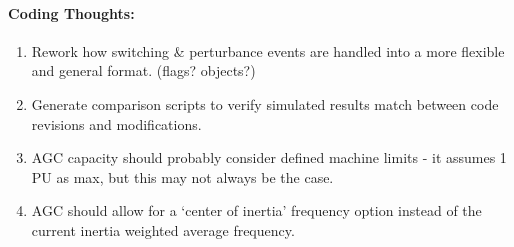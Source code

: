 \documentclass[12pt]{article}
\begin{document}
\begin{multicols}{2}
	
	\paragraph{Coding Thoughts:} 
		\begin{enumerate}
	
			\itemsep 0em 
			\item Rework how switching \& perturbance events are handled into a more flexible and general format. (flags? objects?)
			\item Generate comparison scripts to verify simulated results match  between code revisions and modifications.
			\item AGC capacity should probably consider defined machine limits - it assumes 1 PU as max, but this may not always be the case.
			\item AGC should allow for a `center of inertia' frequency option instead of the current inertia weighted average frequency.
	
		\end{enumerate}
		
\vfill\null

\end{multicols}
\end{document}
